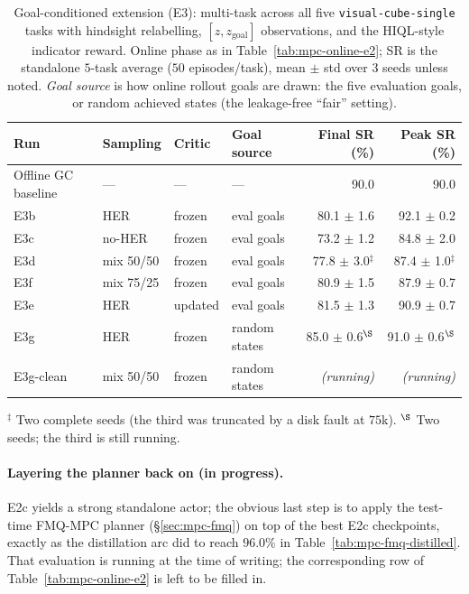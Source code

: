 \begin{table}[h]
\centering
\caption{Goal-conditioned extension (E3): multi-task across all five \texttt{visual-cube-single}
   tasks with hindsight relabelling, $[z, z_{\text{goal}}]$ observations, and the HIQL-style
   indicator reward. Online phase as in Table~\ref{tab:mpc-online-e2}; SR is the standalone $5$-task
   average ($50$ episodes/task), mean $\pm$ std over $3$ seeds unless noted. \emph{Goal source} is
   how online rollout goals are drawn: the five evaluation goals, or random achieved states (the
   leakage-free ``fair'' setting).}
\label{tab:mpc-online-e3}
\begin{tabular}{l l l l r r}
\toprule
Run & Sampling & Critic & Goal source & Final SR (\%) & Peak SR (\%) \\
\midrule
Offline GC baseline & ---        & ---     & ---            & 90.0 & 90.0 \\
\midrule
E3b & HER        & frozen  & eval goals     & 80.1 $\pm$ 1.6 & 92.1 $\pm$ 0.2 \\
E3c & no-HER     & frozen  & eval goals     & 73.2 $\pm$ 1.2 & 84.8 $\pm$ 2.0 \\
E3d & mix 50/50  & frozen  & eval goals     & 77.8 $\pm$ 3.0$^{\ddagger}$ & 87.4 $\pm$ 1.0$^{\ddagger}$ \\
E3f & mix 75/25  & frozen  & eval goals     & 80.9 $\pm$ 1.5 & 87.9 $\pm$ 0.7 \\
E3e & HER        & updated & eval goals     & 81.5 $\pm$ 1.3 & 90.9 $\pm$ 0.7 \\
\midrule
E3g       & HER       & frozen & random states & 85.0 $\pm$ 0.6$^{\S}$ & 91.0 $\pm$ 0.6$^{\S}$ \\
E3g-clean & mix 50/50 & frozen & random states & \textit{(running)} & \textit{(running)} \\
\bottomrule
\end{tabular}

\vspace{2pt}
{\footnotesize $^{\ddagger}$ Two complete seeds (the third was truncated by a disk fault at $75$k).\quad
$^{\S}$ Two seeds; the third is still running.}
\end{table}

\paragraph{Layering the planner back on (in progress).} E2c yields a strong standalone actor; the obvious last step is to apply the test-time FMQ-MPC planner (\S\ref{sec:mpc-fmq}) on top of the best E2c checkpoints, exactly as the distillation arc did to reach $96.0\%$ in Table~\ref{tab:mpc-fmq-distilled}. That evaluation is running at the time of writing; the corresponding row of Table~\ref{tab:mpc-online-e2} is left to be filled in.

